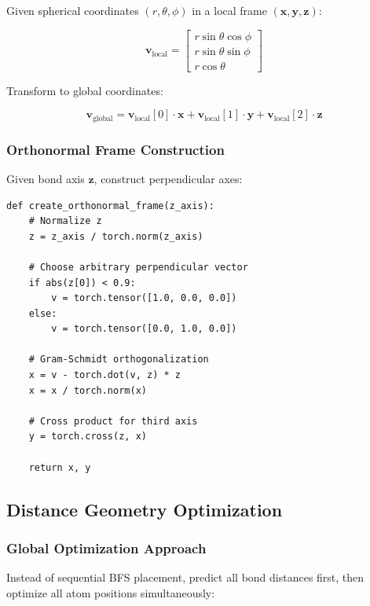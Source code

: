 \documentclass[11pt,a4paper]{article}
\begin{document}
Given spherical coordinates $(r, \theta, \phi)$ in a local frame $(\mathbf{x}, \mathbf{y}, \mathbf{z})$:

\begin{equation}
\mathbf{v}_{\text{local}} = \begin{bmatrix}
r \sin\theta \cos\phi \\
r \sin\theta \sin\phi \\
r \cos\theta
\end{bmatrix}
\end{equation}

Transform to global coordinates:

\begin{equation}
\mathbf{v}_{\text{global}} = \mathbf{v}_{\text{local}}[0] \cdot \mathbf{x} + \mathbf{v}_{\text{local}}[1] \cdot \mathbf{y} + \mathbf{v}_{\text{local}}[2] \cdot \mathbf{z}
\end{equation}

\subsubsection{Orthonormal Frame Construction}

Given bond axis $\mathbf{z}$, construct perpendicular axes:

\begin{lstlisting}[caption={Orthonormal Frame}]
def create_orthonormal_frame(z_axis):
    # Normalize z
    z = z_axis / torch.norm(z_axis)

    # Choose arbitrary perpendicular vector
    if abs(z[0]) < 0.9:
        v = torch.tensor([1.0, 0.0, 0.0])
    else:
        v = torch.tensor([0.0, 1.0, 0.0])

    # Gram-Schmidt orthogonalization
    x = v - torch.dot(v, z) * z
    x = x / torch.norm(x)

    # Cross product for third axis
    y = torch.cross(z, x)

    return x, y
\end{lstlisting}

\subsection{Distance Geometry Optimization}

\subsubsection{Global Optimization Approach}

Instead of sequential BFS placement, predict all bond distances first, then optimize all atom positions simultaneously:
\end{document}
